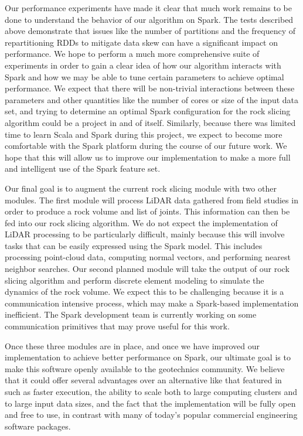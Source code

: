 Our performance experiments have made it clear that much work remains to be done to understand the behavior of our algorithm on Spark. The tests described above demonstrate that issues like the number of partitions and the frequency of repartitioning RDDs to mitigate data skew can have a significant impact on performance. We hope to perform a much more comprehensive suite of experiments in order to gain a clear idea of how our algorithm interacts with Spark and how we may be able to tune certain parameters to achieve optimal performance. We expect that there will be non-trivial interactions between these parameters and other quantities like the number of cores or size of the input data set, and trying to determine an optimal Spark configuration for the rock slicing algorithm could be a project in and of itself. Similarly, because there was limited time to learn Scala and Spark during this project, we expect to become more comfortable with the Spark platform during the course of our future work. We hope that this will allow us to improve our implementation to make a more full and intelligent use of the Spark feature set.

Our final goal is to augment the current rock slicing module with two other modules. The first module will process LiDAR data gathered from field studies in order to produce a rock volume and list of joints. This information can then be fed into our rock slicing algorithm. We do not expect the implementation of LiDAR processing to be particularly difficult, mainly because this will involve tasks that can be easily expressed using the Spark model. This includes processing point-cloud data, computing normal vectors, and performing nearest neighbor searches. Our second planned module will take the output of our rock slicing algorithm and perform discrete element modeling to simulate the dynamics of the rock volume. We expect this to be challenging because it is a communication intensive process, which may make a Spark-based implementation inefficient. The Spark development team is currently working on some communication primitives that may prove useful for this work.

Once these three modules are in place, and once we have improved our implementation to achieve better performance on Spark, our ultimate goal is to make this software openly available to the geotechnics community. We believe that it could offer several advantages over an alternative like that featured in \cite{slicing} such as faster execution, the ability to scale both to large computing clusters and to large input data sizes, and the fact that the implementation will be fully open and free to use, in contrast with many of today's popular commercial engineering software packages.
